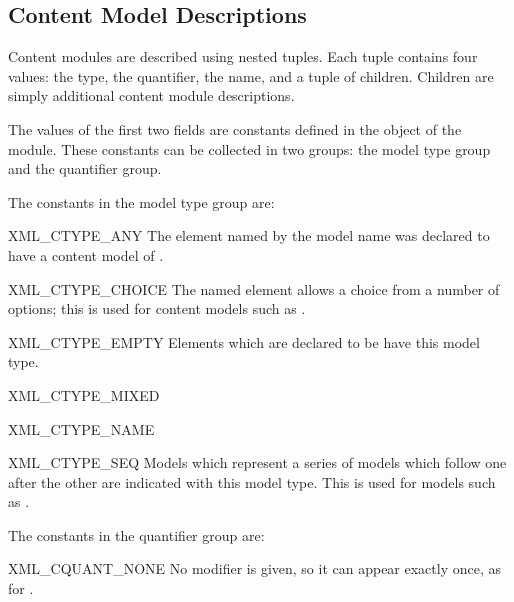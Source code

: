 \subsection{Content Model Descriptions \label{expat-content-models}}

Content modules are described using nested tuples.  Each tuple
contains four values: the type, the quantifier, the name, and a tuple
of children.  Children are simply additional content module
descriptions.

The values of the first two fields are constants defined in the
 object of the  module.  These
constants can be collected in two groups: the model type group and the
quantifier group.

The constants in the model type group are:

\begin{datadescni}{XML_CTYPE_ANY}
The element named by the model name was declared to have a content
model of .
\end{datadescni}

\begin{datadescni}{XML_CTYPE_CHOICE}
The named element allows a choice from a number of options; this is
used for content models such as .
\end{datadescni}

\begin{datadescni}{XML_CTYPE_EMPTY}
Elements which are declared to be  have this model type.
\end{datadescni}

\begin{datadescni}{XML_CTYPE_MIXED}
\end{datadescni}

\begin{datadescni}{XML_CTYPE_NAME}
\end{datadescni}

\begin{datadescni}{XML_CTYPE_SEQ}
Models which represent a series of models which follow one after the
other are indicated with this model type.  This is used for models
such as .
\end{datadescni}


The constants in the quantifier group are:

\begin{datadescni}{XML_CQUANT_NONE}
No modifier is given, so it can appear exactly once, as for .
\end{datadescni}

